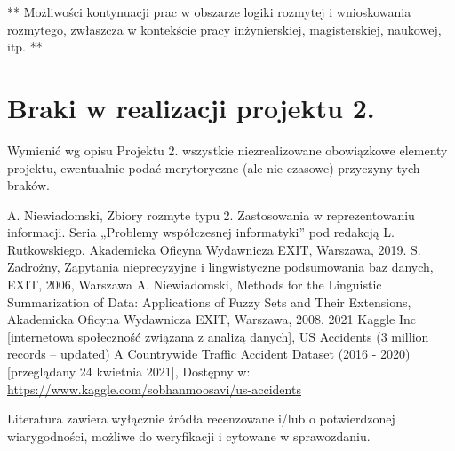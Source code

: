 \documentclass{classrep}
\begin{document}
** Możliwości kontynuacji prac w obszarze logiki rozmytej i wnioskowania rozmytego, zwłaszcza w kontekście pracy inżynierskiej,
magisterskiej, naukowej, itp. **\\



\section{Braki w realizacji projektu 2.}
Wymienić wg opisu Projektu 2. wszystkie niezrealizowane obowiązkowe elementy projektu, ewentualnie
podać merytoryczne (ale nie czasowe) przyczyny tych braków. 


\begin{thebibliography}{99}
  A. Niewiadomski, Zbiory rozmyte typu 2. Zastosowania w reprezentowaniu informacji.  Seria „Problemy współczesnej informatyki” pod redakcją L. Rutkowskiego. Akademicka Oficyna Wydawnicza EXIT, Warszawa, 2019.
 S. Zadrożny, Zapytania nieprecyzyjne i lingwistyczne podsumowania baz danych, EXIT, 2006, Warszawa
 A. Niewiadomski, Methods for the Linguistic Summarization of Data: Applications of Fuzzy Sets and Their Extensions, Akademicka Oficyna Wydawnicza EXIT, Warszawa, 2008.
 2021 Kaggle Inc [internetowa społeczność związana z analizą danych], US Accidents (3 million records -- updated)
A Countrywide Traffic Accident Dataset (2016 - 2020) [przeglądany 24 kwietnia 2021], Dostępny w: \url{https://www.kaggle.com/sobhanmoosavi/us-accidents}
\end{thebibliography}

Literatura zawiera wyłącznie źródła recenzowane i/lub o potwierdzonej wiarygodności,
możliwe do weryfikacji i cytowane w sprawozdaniu. 
\end{document}
